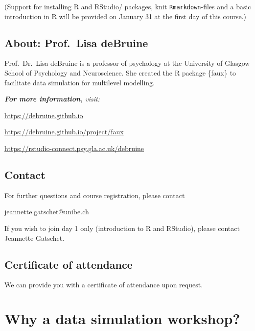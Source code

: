 \documentclass[
  letterpaper,
  DIV=11,
  numbers=noendperiod,
  oneside]{scrreprt}
\begin{document}
(Support for installing R and RStudio/ packages, knit
\texttt{Rmarkdown}-files and a basic introduction in R will be provided
on January 31 at the first day of this course.)

\hypertarget{about-prof.-lisa-debruine}{%
\section*{About: Prof.~Lisa deBruine}\label{about-prof.-lisa-debruine}}


Prof.~Dr.~Lisa deBruine is a professor of psychology at the University
of Glasgow School of Psychology and Neuroscience. She created the R
package \{faux\} to facilitate data simulation for multilevel modelling.

\emph{\textbf{For more information,} visit:}

\url{https://debruine.github.io}

\url{https://debruine.github.io/project/faux}

\url{https://rstudio-connect.psy.gla.ac.uk/debruine}

\hypertarget{contact}{%
\section*{Contact}\label{contact}}


For further questions and course registration, please contact

jeannette.gatschet@unibe.ch

If you wish to join day 1 only (introduction to R and RStudio), please
contact Jeannette Gatschet.

\hypertarget{certificate-of-attendance}{%
\section*{Certificate of attendance}\label{certificate-of-attendance}}


We can provide you with a certificate of attendance upon request.


\hypertarget{why-a-data-simulation-workshop}{%
\chapter*{Why a data simulation
workshop?}\label{why-a-data-simulation-workshop}}
\end{document}
